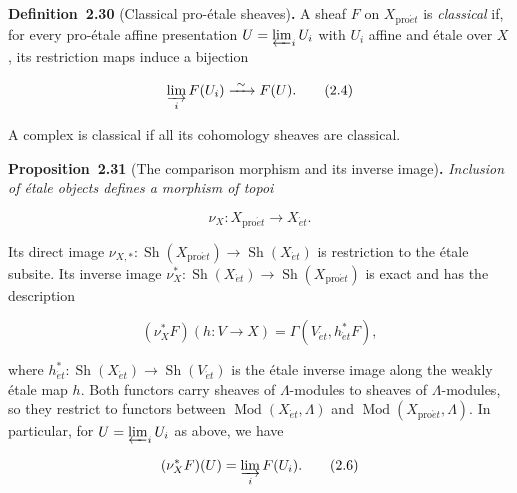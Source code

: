 \documentclass[11pt]{article}
\newenvironment{bpstatement}[2]{\par\addvspace{0.6\baselineskip}\noindent\textbf{#1}#2\textbf{.}\enspace\ignorespaces}
  {\par\addvspace{0.4\baselineskip}}
\newenvironment{bpstatementit}[2]{\begin{bpstatement}{#1}{#2}\itshape\ignorespaces}{\end{bpstatement}}
\providecommand{\Sh}{}\renewcommand{\Sh}{\operatorname{Sh}}
\begin{document}
\label{bp91}%
\begin{bpstatement}{Definition~2.30}{ (Classical pro-étale sheaves)}
A sheaf \(F\) on \(X_{\mathrm{pro}\acute{e}t}\) is \emph{classical} if, for every pro-étale affine presentation \(U=\varprojlim_i U_i\) with \(U_i\) affine and étale over \(X\), its restriction maps induce a bijection

\[
\varinjlim_i F(U_i)\xrightarrow{\ \sim\ }F(U).
\tag{2.4}
\]

A complex is classical if all its cohomology sheaves are classical.
\end{bpstatement}

\label{bp92}%
\begin{bpstatementit}{Proposition~2.31}{ (The comparison morphism and its inverse image)}
Inclusion of étale objects defines a morphism of topoi

\[
\nu_X:X_{\mathrm{pro}\acute{e}t}\longrightarrow X_{\acute{e}t}.
\]

Its direct image \(\nu_{X,*}:\Sh(X_{\mathrm{pro}\acute{e}t})\to\Sh(X_{\acute{e}t})\) is restriction to the étale subsite. Its inverse image \(\nu_X^*:\Sh(X_{\acute{e}t})\to\Sh(X_{\mathrm{pro}\acute{e}t})\) is exact and has the description

\[
(\nu_X^*F)(h:V\to X)
=\Gamma(V_{\acute{e}t},h_{\acute{e}t}^*F),
\tag{2.5}
\]

where \(h_{\acute{e}t}^*:\Sh(X_{\acute{e}t})\to\Sh(V_{\acute{e}t})\) is the étale inverse image along the weakly étale map \(h\). Both functors carry sheaves of \(\Lambda\)-modules to sheaves of \(\Lambda\)-modules, so they restrict to functors between \(\operatorname{Mod}(X_{\acute{e}t},\Lambda)\) and \(\operatorname{Mod}(X_{\mathrm{pro}\acute{e}t},\Lambda)\). In particular, for \(U=\varprojlim_iU_i\) as above, we have

\[
(\nu_X^*F)(U)=\varinjlim_i F(U_i).
\tag{2.6}
\]
\end{bpstatementit}
\end{document}
